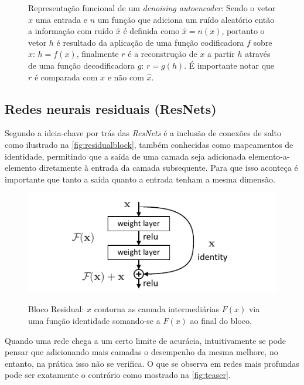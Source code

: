 				\begin{figure}[h]
					\centering
					\caption[Representação funcional de um \textit{denoising autoencoder}]{Representação funcional de um \textit{denoising autoencoder}: Sendo o vetor $x$ uma entrada e $n$ um função que adiciona um ruído aleatório então a informação com ruído $\hat{x}$ é definida como $\hat{x} = n(x)$, portanto o vetor $h$ é resultado da aplicação de uma função codificadora $f$ sobre $x$: $h = f(x)$, finalmente $r$ é a reconstrução de $x$ a partir $h$ através de uma função decodificadora $g$: $r = g(h)$. É importante notar que $r$ é comparada com $x$ e não com $\hat{x}$.}
					
					\label{fig:denoisingAutoencoder}
				\end{figure}
							
		\subsection{Redes neurais residuais (ResNets)}
			\par Segundo \cite{DBLP:journals/corr/HeZRS15} a ideia-chave por trás das \textit{ResNets} é a inclusão de conexões de salto como ilustrado na  \autoref{fig:residualblock}, também conhecidas como mapeamentos de identidade, permitindo que a saída de uma camada seja adicionada elemento-a-elemento diretamente à entrada da camada subsequente. Para que isso aconteça é importante que tanto a saída quanto a entrada tenham a mesma dimensão.
			
			\begin{figure}[H]
				\centering
				\caption[Bloco residual]{Bloco Residual: $x$ contorna as camada intermediárias $F(x)$ via uma função identidade somando-se a $F(x)$ ao final do bloco.}
				\includegraphics[width=0.7\linewidth]{images/residualBlock}
				\label{fig:residualblock}
			\end{figure}
			
			
			\par Quando uma rede chega a um certo limite de acurácia, intuitivamente se pode pensar que adicionando mais camadas o desempenho da mesma melhore, no entanto, na prática isso não se verifica. O que se observa em redes mais profundas pode ser exatamente o contrário como mostrado na \autoref{fig:teaser}.
			
